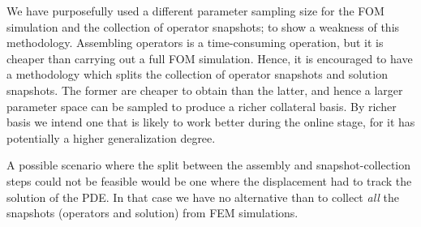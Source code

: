\documentclass[../../thesis.tex]{subfiles}
\begin{document}
We have purposefully used a different parameter sampling size 
for the FOM simulation and the collection of operator snapshots;
to show a weakness of this methodology.
Assembling operators is a time-consuming operation, 
but it is cheaper than carrying out a full FOM simulation.
Hence, it is encouraged to have a methodology which splits the collection
of operator snapshots and solution snapshots.
The former are cheaper to obtain than the latter, 
and hence a larger parameter space can be sampled to produce a richer collateral basis.
By richer basis we intend one that is likely to work better during the online stage, 
for it has potentially a higher generalization degree.

A possible scenario where the split between the assembly and snapshot-collection steps
could not be feasible would be one where the displacement had to track the solution of the PDE.
In that case we have no alternative than to collect 
\textit{all} the snapshots (operators and solution) from FEM simulations.

\end{document}
